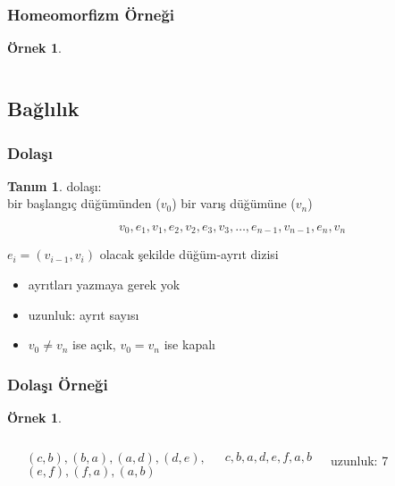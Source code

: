 \documentclass[dvipsnames]{beamer}
\theoremstyle{definition}
\newtheorem{tanim}[theorem]{Tanım}
\theoremstyle{example}
\newtheorem{ornek}[theorem]{Örnek}
\theoremstyle{plain}
\begin{document}
\begin{frame}
  \frametitle{Homeomorfizm Örneği}

  \begin{ornek}
    \begin{columns}
      \begin{center}
      \end{center}

      \begin{center}
      \end{center}
    \end{columns}
  \end{ornek}
\end{frame}

\subsection{Bağlılık}

\begin{frame}
  \frametitle{Dolaşı}

  \begin{tanim}
    \alert{dolaşı}:\\
    bir başlangıç düğümünden ($v_0$) bir varış düğümüne ($v_n$)

    \[
      v_0,e_1,v_1,e_2,v_2,e_3,v_3,\dots,e_{n-1},v_{n-1},e_n,v_n
    \]

    $e_i=(v_{i-1},v_i)$ olacak şekilde düğüm-ayrıt dizisi
  \end{tanim}

  \pause
  \begin{itemize}
    \item ayrıtları yazmaya gerek yok

    \pause
    \medskip
    \item \alert{uzunluk}: ayrıt sayısı
    \item $v_0 \neq v_n$ ise \alert{açık}, $v_0 = v_n$ ise \alert{kapalı}
  \end{itemize}
\end{frame}

\begin{frame}
  \frametitle{Dolaşı Örneği}

  \begin{ornek}
    \begin{columns}
      \begin{center}
      \end{center}

      $(c,b),(b,a),(a,d),(d,e),$\\
      $(e,f),(f,a),(a,b)$

      \medskip
      $c,b,a,d,e,f,a,b$

      \bigskip
      uzunluk: 7
    \end{columns}
  \end{ornek}
\end{frame}
\end{document}
